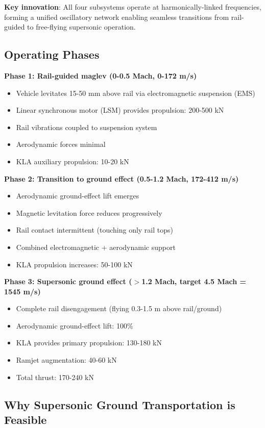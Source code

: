 \documentclass[12pt,a4paper]{article}
\begin{document}
\textbf{Key innovation}: All four subsystems operate at harmonically-linked frequencies, forming a unified oscillatory network enabling seamless transitions from rail-guided to free-flying supersonic operation.

\subsection{Operating Phases}

\textbf{Phase 1: Rail-guided maglev (0-0.5 Mach, 0-172 m/s)}
\begin{itemize}
\item Vehicle levitates 15-50 mm above rail via electromagnetic suspension (EMS)
\item Linear synchronous motor (LSM) provides propulsion: 200-500 kN
\item Rail vibrations coupled to suspension system
\item Aerodynamic forces minimal
\item KLA auxiliary propulsion: 10-20 kN
\end{itemize}

\textbf{Phase 2: Transition to ground effect (0.5-1.2 Mach, 172-412 m/s)}
\begin{itemize}
\item Aerodynamic ground-effect lift emerges
\item Magnetic levitation force reduces progressively
\item Rail contact intermittent (touching only rail tops)
\item Combined electromagnetic + aerodynamic support
\item KLA propulsion increases: 50-100 kN
\end{itemize}

\textbf{Phase 3: Supersonic ground effect ($>$1.2 Mach, target 4.5 Mach = 1545 m/s)}
\begin{itemize}
\item Complete rail disengagement (flying 0.3-1.5 m above rail/ground)
\item Aerodynamic ground-effect lift: 100\%
\item KLA provides primary propulsion: 130-180 kN
\item Ramjet augmentation: 40-60 kN
\item Total thrust: 170-240 kN
\end{itemize}

\subsection{Why Supersonic Ground Transportation is Feasible}
\end{document}
